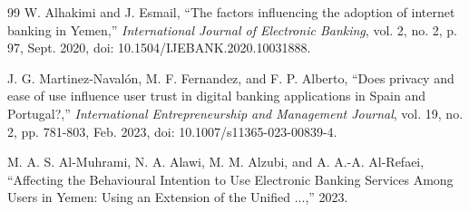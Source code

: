 \documentclass[12pt,a4paper,oneside]{report}
\begin{document}
\begin{thebibliography}{99}
		W. Alhakimi and J. Esmail, ``The factors influencing the adoption of internet banking in Yemen,'' \textit{International Journal of Electronic Banking}, vol. 2, no. 2, p. 97, Sept. 2020, doi: 10.1504/IJEBANK.2020.10031888.
		
		J. G. Martinez-Navalón, M. F. Fernandez, and F. P. Alberto, ``Does privacy and ease of use influence user trust in digital banking applications in Spain and Portugal?,'' \textit{International Entrepreneurship and Management Journal}, vol. 19, no. 2, pp. 781-803, Feb. 2023, doi: 10.1007/s11365-023-00839-4.
		
		M. A. S. Al-Muhrami, N. A. Alawi, M. M. Alzubi, and A. A.-A. Al-Refaei, ``Affecting the Behavioural Intention to Use Electronic Banking Services Among Users in Yemen: Using an Extension of the Unified ...,'' 2023.
		
	\end{thebibliography}
	
\end{document}
